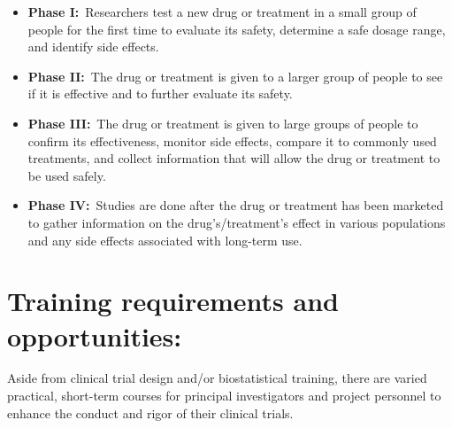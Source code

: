 \documentclass[]{book}
\begin{document}
\begin{itemize}
\item
  \textbf{Phase I:}~Researchers test a new drug or treatment in a small
  group of people for the first time to evaluate its safety, determine a
  safe dosage range, and identify side effects.
\item
  \textbf{Phase II:}~The drug or treatment is given to a larger group of
  people to see if it is effective and to further evaluate its safety.
\item
  \textbf{Phase III:}~The drug or treatment is given to large groups of
  people to confirm its effectiveness, monitor side effects, compare it
  to commonly used treatments, and collect information that will allow
  the drug or treatment to be used safely.
\item
  \textbf{Phase IV:}~Studies are done after the drug or treatment has
  been marketed to gather information on the drug's/treatment's effect
  in various populations and any side effects associated with long-term
  use.
\end{itemize}

\section{Training requirements and
opportunities:}\label{training-requirements-and-opportunities}

Aside from clinical trial design and/or biostatistical training, there
are varied practical, short-term courses for principal investigators and
project personnel to enhance the conduct and rigor of their clinical
trials.
\end{document}
